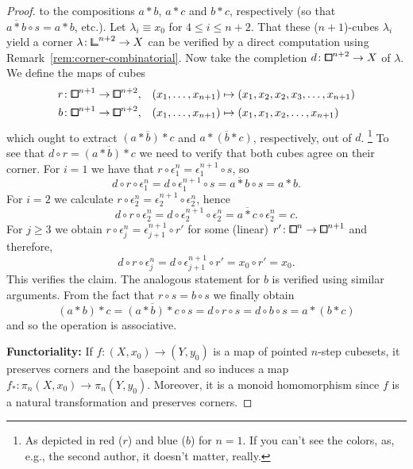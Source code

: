 \begin{proof}
to the compositions $a*b$, $a*c$ and $b*c$, respectively (so that $\overline{a*b}\circ s = a*b$, etc.).
Let $\lambda_i \equiv x_0$ for $4\leq i\leq n+2$.
That these ($n+1$)-cubes $\lambda_i$ yield a corner $\lambda\colon{\bbcor}^{n+2}\to X$
can be verified by a direct computation using Remark~\ref{rem:corner-combinatorial}.
Now take the completion $d\colon{\bbox}^{n+2}\to X$ of $\lambda$.
We define the maps of cubes
\begin{align*}
    r\colon{\bbox}^{n+1}\to{\bbox}^{n+2},\quad &(x_1,\ldots,x_{n+1})\mapsto(x_1,x_2,x_2,x_3,\ldots,x_{n+1}) \\
    b\colon{\bbox}^{n+1}\to{\bbox}^{n+2},\quad &(x_1,\ldots,x_{n+1})\mapsto(x_1,x_1,x_2,\ldots,x_{n+1})
\end{align*}
which ought to extract $\overline{(a*b)*c}$ and $\overline{a*(b*c)}$, respectively, out of $d$.%
\footnote{As depicted in red ($r$) and blue ($b$) for $n=1$. If you can't see the colors, as, e.g., the second author, it doesn't matter, really.}
To see that $d\circ r = \overline{(a*b)*c}$ we need to verify that both cubes agree on their corner.
For $i=1$ we have that $r\circ\epsilon_1^n = \epsilon_1^{n+1}\circ s$,
so
\[
    d\circ r\circ\epsilon_1^n = d\circ\epsilon_1^{n+1}\circ s = \overline{a*b}\circ s = a*b.
\]
For $i=2$ we calculate $r\circ\epsilon_2^n = \epsilon_2^{n+1}\circ\epsilon_2^n$,
hence
\[
    d\circ r\circ\epsilon_2^n = d\circ\epsilon_2^{n+1}\circ\epsilon_2^n = \overline{a*c}\circ\epsilon_2^n = c.
\]
For $j\geq 3$ we obtain $r\circ\epsilon_j^n = \epsilon_{j+1}^{n+1}\circ r'$ for some (linear) $r'\colon{\bbox}^n\to{\bbox}^{n+1}$ and therefore,
\[
    d\circ r\circ\epsilon_j^n = d\circ\epsilon_{j+1}^{n+1}\circ r' = x_0\circ r' = x_0.
\]
This verifies the claim.
The analogous statement for $b$ is verified using similar arguments.
From the fact that $r\circ s = b\circ s$ we finally obtain
\[
    (a*b)*c = \overline{(a*b)*c}\circ s = d\circ r\circ s = d\circ b\circ s = a*(b*c)
\]
and so the operation is associative.

\textbf{Functoriality:}
If $f\colon(X,x_0)\to(Y,y_0)$ is a map of pointed $n$-step cubesets,
it preserves corners and the basepoint and so induces a map $f_\ast\colon\pi_n(X,x_0)\to\pi_n(Y,y_0)$.
Moreover, it is a monoid homomorphism since $f$ is a natural transformation and preserves corners.
\end{proof}

